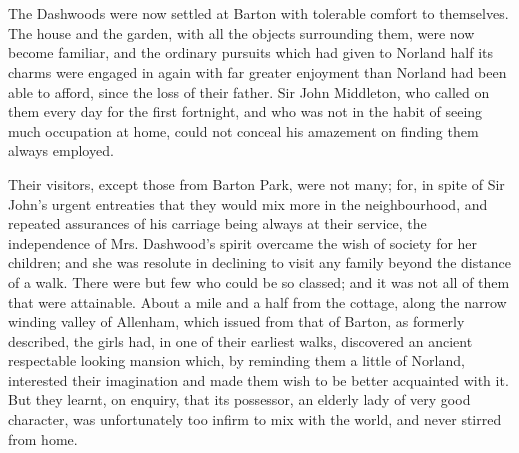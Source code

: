 

\chapter{} %

The Dashwoods were now settled at Barton with tolerable comfort to themselves. The house and the garden, with all the objects surrounding them, were now become familiar, and the ordinary pursuits which had given to Norland half its charms were engaged in again with far greater enjoyment than Norland had been able to afford, since the loss of their father. Sir John Middleton, who called on them every day for the first fortnight, and who was not in the habit of seeing much occupation at home, could not conceal his amazement on finding them always employed.

Their visitors, except those from Barton Park, were not many; for, in spite of Sir John's urgent entreaties that they would mix more in the neighbourhood, and repeated assurances of his carriage being always at their service, the independence of Mrs. Dashwood's spirit overcame the wish of society for her children; and she was resolute in declining to visit any family beyond the distance of a walk. There were but few who could be so classed; and it was not all of them that were attainable. About a mile and a half from the cottage, along the narrow winding valley of Allenham, which issued from that of Barton, as formerly described, the girls had, in one of their earliest walks, discovered an ancient respectable looking mansion which, by reminding them a little of Norland, interested their imagination and made them wish to be better acquainted with it. But they learnt, on enquiry, that its possessor, an elderly lady of very good character, was unfortunately too infirm to mix with the world, and never stirred from home.

